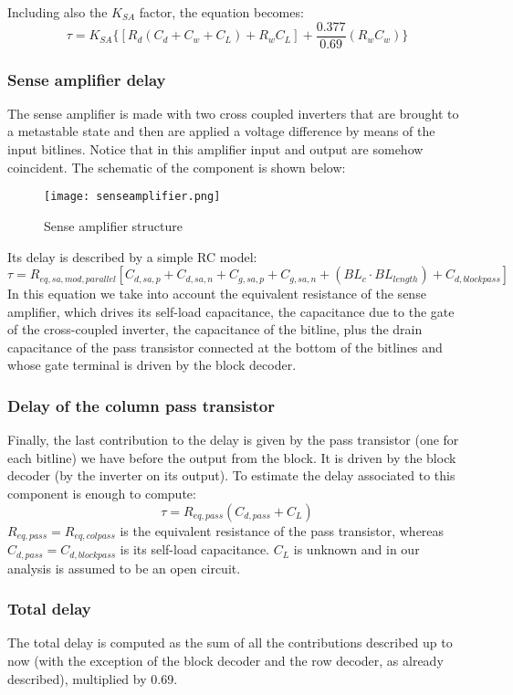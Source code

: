 Including also the $K_{SA}$ factor, the equation becomes: 
$$\tau=K_{SA}\{[R_d(C_d+C_w+C_L)+R_wC_L]+\frac{0.377}{0.69}(R_wC_w)\}$$

\subsubsection{Sense amplifier delay}
The sense amplifier is made with two cross coupled inverters that are brought to a metastable state and then are applied a voltage difference by means of the input bitlines. Notice that in this amplifier input and output are somehow coincident. The schematic of the component is shown below:

\begin{figure}[h] 
	\begin{center}
		\texttt{[image: senseamplifier.png]}
	\end{center}
	\caption{Sense amplifier structure} 
\end{figure}

Its delay is described by a simple RC model:
$$\tau=R_{eq,sa,mod,parallel}[C_{d,sa,p}+C_{d,sa,n}+C_{g,sa,p}+C_{g,sa,n}+(BL_c\cdot BL_{length})+C_{d,blockpass}]$$
In this equation we take into account the equivalent resistance of the sense amplifier, which drives its self-load capacitance, the capacitance due to the gate of the cross-coupled inverter, the capacitance of the bitline, plus the drain capacitance of the pass transistor connected at the bottom of the bitlines and whose gate terminal is driven by the block decoder.

\subsubsection{Delay of the column pass transistor}
Finally, the last contribution to the delay is given by the pass transistor (one for each bitline) we have before the output from the block. It is driven by the block decoder (by the inverter on its output). To estimate the delay associated to this component is enough to compute:
$$\tau=R_{eq,pass}(C_{d,pass}+C_L)$$
$R_{eq,pass}=R_{eq,colpass}$ is the equivalent resistance of the pass transistor, whereas $C_{d,pass}=C_{d,blockpass}$ is its self-load capacitance. $C_L$ is unknown and in our analysis is assumed to be an open circuit. 

\subsubsection{Total delay}
The total delay is computed as the sum of all the contributions described up to now (with the exception of the block decoder and the row decoder, as already described), multiplied by 0.69.

